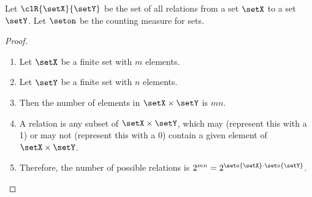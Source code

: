 \begin{proposition}
\label{prop:rel_order}
Let $\clR{\setX}{\setY}$ be the set of all relations from a set $\setX$ to a set $\setY$.
Let $\seton$ be the counting measure for sets.
\end{proposition}
\begin{proof}
  \begin{enumerate}
    \item Let $\setX$ be a finite set with $m$ elements.\\
    \item Let $\setY$ be a finite set with $n$ elements.\\
    \item Then the number of elements in $\setX\times\setY$ is $mn$.
    \item A relation is any subset of $\setX\times\setY$, which may (represent this with a 1)
          or may not (represent this with a 0) contain a given element of $\setX\times\setY$.
    \item Therefore, the number of possible relations is $2^{mn}=2^{\seto{\setX}\cdot\seto{\setY}}$.
  \end{enumerate}
\end{proof}

